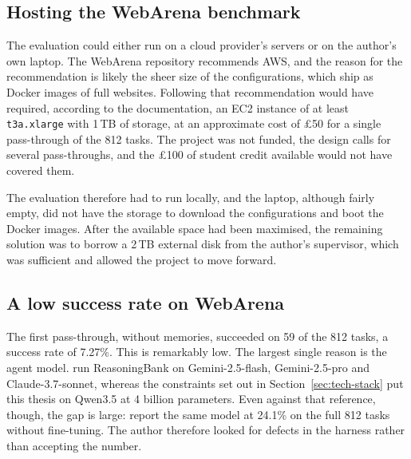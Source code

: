 \subsection{Hosting the WebArena benchmark}

The evaluation could either run on a cloud provider's servers or on the author's own laptop. The WebArena repository recommends AWS, and the reason for the recommendation is likely the sheer size of the configurations, which ship as Docker images of full websites. Following that recommendation would have required, according to the documentation, an EC2 instance of at least \texttt{t3a.xlarge} with 1\,TB of storage, at an approximate cost of \pounds 50 for a single pass-through of the 812 tasks. The project was not funded, the design calls for several pass-throughs, and the \pounds 100 of student credit available would not have covered them.

The evaluation therefore had to run locally, and the laptop, although fairly empty, did not have the storage to download the configurations and boot the Docker images. After the available space had been maximised, the remaining solution was to borrow a 2\,TB external disk from the author's supervisor, which was sufficient and allowed the project to move forward.

\subsection{A low success rate on WebArena}\label{sec:difficulty-success-rate}

The first pass-through, without memories, succeeded on 59 of the 812 tasks, a success rate of 7.27\%. This is remarkably low. The largest single reason is the agent model. \citet{ouyang2025reasoningbank} run ReasoningBank on Gemini-2.5-flash, Gemini-2.5-pro and Claude-3.7-sonnet, whereas the constraints set out in Section~\ref{sec:tech-stack} put this thesis on Qwen3.5 at 4 billion parameters. Even against that reference, though, the gap is large: \citet{lu2026distillation} report the same model at 24.1\% on the full 812 tasks without fine-tuning. The author therefore looked for defects in the harness rather than accepting the number.

